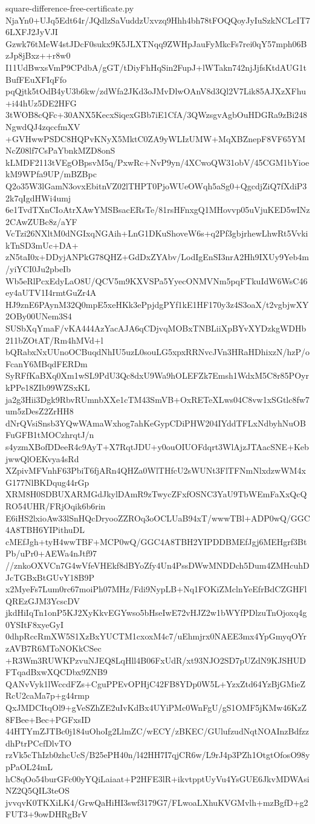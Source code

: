 \documentclass[11pt]{article}
\theoremstyle{definition}
\theoremstyle{remark}
\begin{document}
\begin{filecontents*}[overwrite]{square-difference-free-certificate.py}
NjaYn0+UJq5Edt64r/JQdlzSaVuddzUxvzq9Hhh4bh78tFOQQoyJyIuSzkNCLcIT76LXFJ2JyVJI
Gzwk76tMeW4stJDcF0sukx9K5JLXTNqq9ZWHpJauFyMkcFs7rei0qY57mph06BzJp8jBxz++r8w0
I11UdBwxsVmP9CPdbA/gGT/tDiyFhHqSin2FupJ+lWTakn742njJjfsKtdAUG1tBufFEuXFIqFfo
pqQjtk5tOdB4yU3b6kw/zdWfa2JKd3oJMvDlwOAnV8d3Ql2V7Lik85AJXzXFhu+i44hUz5DE2HFG
3tWOB8cQFc+30ANX5KecxSiqexGBb7iE1CfA/3QWzsgvAgbOuHDGRa9zBi248NgwdQJ4zqccfmXV
+GVHwwPSDC8HQPvKNyX5MktC0ZA9yWLIzUMW+MqXBZnepF8VF65YMNcZ08lf7CsPaYbnkMZD8onS
kLMDF2113tVEgOBpsvM5q/PxwRc+NvP9yn/4XCwoQW31obV/45CGM1bYioekM9WPfa9UP/mBZBpc
Q2o35W3lGamN3ovxEbitnVZ02lTHPT0PjoWUeOWqh5aSg0+QgcdjZiQ7fXdiP32k7qIgdHWi4umj
6e1TvdTXnCIoAtrXAwYMSBsacERsTe/81rsHFnxgQ1MHovvp05uVjuKED5wINz2CAwZUBc8z/aYF
VcTzi26NXltM0dNGIxqNGAih+LnG1DKuShoveW6s+q2Pf3gbjrhewLhwRt5VvkikTnSD3mUc+DA+
zN5taI0x+DDyjANPkG78QHZ+GdDxZYAbv/LodIgEnSI3nrA2Hh9IXUy9Yeb4m/yiYCI0Ju2pbeIb
Wb5eRlPcxEdyLaO8U/QCV5m9KXVSPa5YyecONMVNm5pqFTkuIdW6WsC46ey4aUTV1I4rmtGuZr4A
HJ9znE6PAynM32Q0mpE5xeHKk3ePpjdgPYf1kE1HF170y3z4S3oaX/t2vgbjwXY2OBy00UNem3S4
SUSbXqYmaF/vKA444AzYacAJA6qCDjvqMOBxTNBLiiXpBYvXYDzkgWDHb211bZOtAT/Rm4hMVd+l
bQRabxNxUUnoOCBuqdNhIU5uzL0souLG5xpxRRNvcJVn3HRaHDhixzN/hzP/oFcanY6MBqdFERDm
SyRFfKaBXq0Xm1wSL9PdU3Qc8dxU9Wa9hOLEFZk7Emsh1WdxM5C8r85POyrkPPe18ZIb99WZSxKL
ja2g3Hii3Dgk9RbvRUmnbXXe1cTM43SmVB+OxRETeXLws04C8vw1xSGtlc8fw7um5zDesZ2ZrHH8
dNrQVsiSnsb3YQwWAmaWxhog7ahKeGypCDiPHW204IYddTFLxNdbyhNuOBFuGFB1tMOCzhrqtJ/n
s4yzmXBofDDeeR4c9AyT+X7RqtJDU+y0ouOIUOFdqrt3WlAjzJTAacSNE+KebjwwQlOEKvya4sRd
XZpivMFVnhF63PbiT6fjARn4QHZa0WlTHfcU2sWUNt3FlTFNmNlxdzwWM4xG177NlBKDqug44rGp
XRM8H0SDBUXARMGdJkylDAmR9zTwycZFxfOSNC3YaU9TbWEmFaXxQcQRO54UHR/FRjOqik6b6rin
E6iHS2lxioAw33lSnHQcDryooZZROq3oOCLUaB94xT/wwwTBl+ADP0wQ/GGC4A8TBH6YIPithuDL
cMEfJgh+tyH4wwTBF+MCP0wQ/GGC4A8TBH2YIPDDBMEfJgj6MEHgrf3BtPb/uPr0+AEWa4nJtf97
//znkoOXVCn7G4wVfeVHEkf8dBYoZfy4Un4PssDWwMNDDch5Dum4ZMHcuhDJcTGBxBtGUvY18B9P
x2MyeFs7Lum0rc67moiPh07MHz/Fdi9NypLB+Nq1FOKiZMclnYeEfrBdCZGHFlQREzGJM3YcscDV
jkdHiIqTn1onP5KJ2XyKkvEGYwso5bHseIwE72vHJZ2w1bWYfPDlzuTnOjoxq4g0YSItF8xyeGyI
0dhpRccRmXW5S1XzBxYUCTM1cxoxM4c7/uEhmjrx0NAEE3mx4YpGmyqOYrzAVB7R6MToNOKkCSec
+R3Wm3RUWKPzvuNJEQ8LqHll4B06FxUdR/xt93NJO2SD7pUZdN9KJSHUDFTqadBxwXQCDbx9ZNB9
QANvVyk1lWccdFZs+CguPPEvOPHjC42FB8YDp0W5L+YzxZtd64YzBjGMieZRcU2caMa7p+g44rmp
QxJMDCItqOl9+gVeSZhZE2uIvKdBx4UYiPMc0WnFgU/gS1OMF5jKMw46KzZ8FBee+Bec+PGFxsID
44HTYmZJTBc0j184uOhoIg2LlmZC/wECY/zBKEC/GUlufzudNqtNOAInzBdfzzdhPtrPCcfDlvTO
rzVk5cThIzb0zhcUcS/B25ePH40n/l42HH7I7qjCR6w/L9rJ4p3PZh1OtgtOfosO98ypPaOL24mL
hC8qOo54burGFc00yYQiLaiaat+P2HFE3lR+ikvtpptUyVu4YsGUE6JkvMDWAsiNZ2Q5QIL3teOS
jvvqvK0TKXiLK4/GrwQaHiHI3swf3179G7/FLwoaLXhuKVGMvlh+mzBgfD+g2FUT3+9owDHRgBrV

\end{filecontents*}
\end{document}
